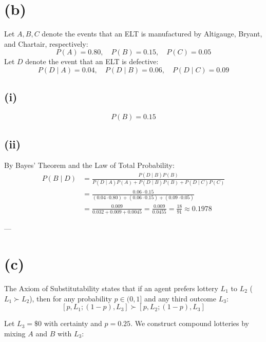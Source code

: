 \documentclass[11pt]{article}
\begin{document}
\pagebreak

\section*{(b)}

Let $A, B, C$ denote the events that an ELT is manufactured by Altigauge, Bryant, and Chartair, respectively:
\[
P(A) = 0.80, \quad P(B) = 0.15, \quad P(C) = 0.05
\]
Let $D$ denote the event that an ELT is defective:
\[
P(D \mid A) = 0.04, \quad P(D \mid B) = 0.06, \quad P(D \mid C) = 0.09
\]

\subsection*{(i)}

\[
P(B) = 0.15
\]

\subsection*{(ii)}

By Bayes' Theorem and the Law of Total Probability:
\begin{align*}
P(B \mid D) &= \frac{P(D \mid B) P(B)}{P(D \mid A) P(A) + P(D \mid B) P(B) + P(D \mid C) P(C)} \\[1ex]
&= \frac{0.06 \cdot 0.15}{(0.04 \cdot 0.80) + (0.06 \cdot 0.15) + (0.09 \cdot 0.05)} \\[1ex]
&= \frac{0.009}{0.032 + 0.009 + 0.0045} = \frac{0.009}{0.0455} = \frac{18}{91} \approx 0.1978
\end{align*}

---

\section*{(c)}

The Axiom of Substitutability states that if an agent prefers lottery $L_1$ to $L_2$ ($L_1 \succ L_2$), then for any probability $p \in (0, 1]$ and any third outcome $L_3$:
\[
[p, L_1; (1-p), L_3] \succ [p, L_2; (1-p), L_3]
\]

Let $L_3 = \$0$ with certainty and $p = 0.25$. We construct compound lotteries by mixing $A$ and $B$ with $L_3$:
\end{document}
